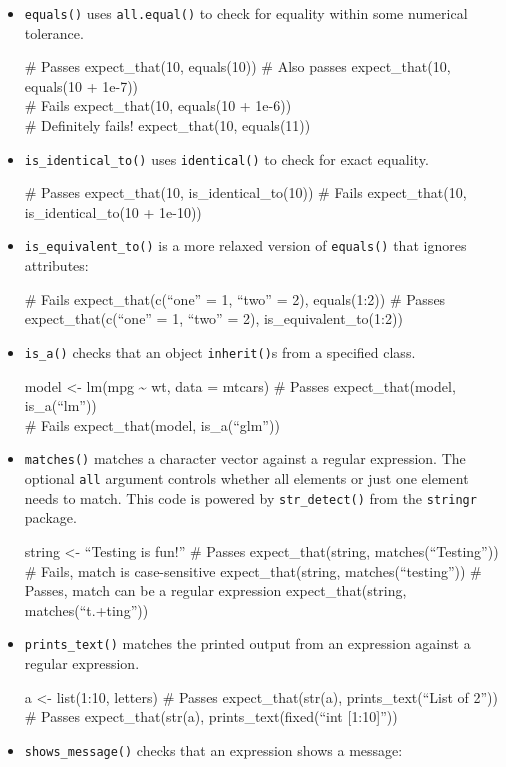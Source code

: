 \begin{itemize}
\item
  \texttt{equals()} uses \texttt{all.equal()} to check for equality
  within some numerical tolerance.

  \# Passes expect\_that(10, equals(10)) \# Also passes expect\_that(10,
  equals(10 + 1e-7))\\ \# Fails expect\_that(10, equals(10 + 1e-6))\\ \#
  Definitely fails! expect\_that(10, equals(11))
\item
  \texttt{is\_identical\_to()} uses \texttt{identical()} to check for
  exact equality.

  \# Passes expect\_that(10, is\_identical\_to(10)) \# Fails
  expect\_that(10, is\_identical\_to(10 + 1e-10))
\item
  \texttt{is\_equivalent\_to()} is a more relaxed version of
  \texttt{equals()} that ignores attributes:

  \# Fails expect\_that(c(``one'' = 1, ``two'' = 2), equals(1:2)) \#
  Passes expect\_that(c(``one'' = 1, ``two'' = 2),
  is\_equivalent\_to(1:2))
\item
  \texttt{is\_a()} checks that an object \texttt{inherit()}s from a
  specified class.

  model \textless{}- lm(mpg \textasciitilde{} wt, data = mtcars) \#
  Passes expect\_that(model, is\_a(``lm''))\\ \# Fails
  expect\_that(model, is\_a(``glm''))
\item
  \texttt{matches()} matches a character vector against a regular
  expression. The optional \texttt{all} argument controls whether all
  elements or just one element needs to match. This code is powered by
  \texttt{str\_detect()} from the \texttt{stringr} package.

  string \textless{}- ``Testing is fun!'' \# Passes expect\_that(string,
  matches(``Testing'')) \# Fails, match is case-sensitive
  expect\_that(string, matches(``testing'')) \# Passes, match can be a
  regular expression expect\_that(string, matches(``t.+ting''))
\item
  \texttt{prints\_text()} matches the printed output from an expression
  against a regular expression.

  a \textless{}- list(1:10, letters) \# Passes expect\_that(str(a),
  prints\_text(``List of 2'')) \# Passes expect\_that(str(a),
  prints\_text(fixed(``int {[}1:10{]}''))
\item
  \texttt{shows\_message()} checks that an expression shows a message:


\end{itemize}
